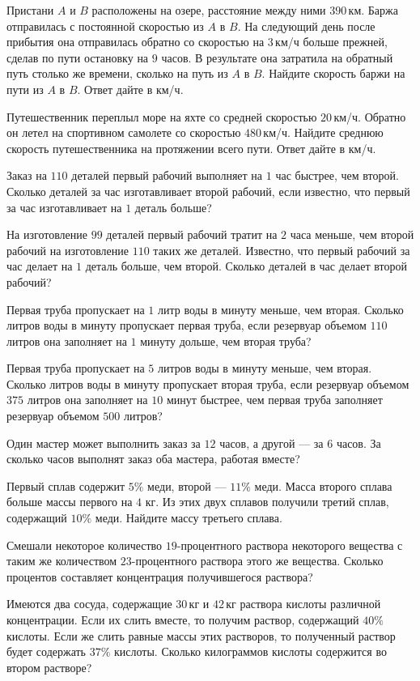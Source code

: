 \begin{consultation}
	\begin{listofex}
		\item Пристани \( A \) и \( B \) расположены на озере, расстояние между ними \( 390 \) км. Баржа отправилась с постоянной скоростью из \( A \) в \( B \). На следующий день после прибытия она отправилась обратно со скоростью на \( 3 \) км/ч больше прежней, сделав по пути остановку на \( 9 \) часов. В результате она затратила на обратный путь столько же времени, сколько на путь из \( A \) в \( B \). Найдите скорость баржи на пути из \( A \) в \( B \). Ответ дайте в км/ч.
		\item Путешественник переплыл море на яхте со средней скоростью \( 20 \) км/ч. Обратно он летел на спортивном самолете со скоростью \( 480 \) км/ч. Найдите среднюю скорость путешественника на протяжении всего пути. Ответ дайте в км/ч.
		\item Заказ на \( 110 \) деталей первый рабочий выполняет на \( 1 \) час быстрее, чем второй. Сколько деталей за час изготавливает второй рабочий, если известно, что первый за час изготавливает на \( 1 \) деталь больше?
		\item На изготовление \( 99 \) деталей первый рабочий тратит на \( 2 \) часа меньше, чем второй рабочий на изготовление \( 110 \) таких же деталей. Известно, что первый рабочий за час делает на \( 1 \) деталь больше, чем второй. Сколько деталей в час делает второй рабочий?
		\item Первая труба пропускает на \( 1 \) литр воды в минуту меньше, чем вторая. Сколько литров воды в минуту пропускает первая труба, если резервуар объемом \( 110 \) литров она заполняет на \( 1 \) минуту дольше, чем вторая труба?
		\item Первая труба пропускает на \( 5 \) литров воды в минуту меньше, чем вторая. Сколько литров воды в минуту пропускает вторая труба, если резервуар объемом \( 375 \) литров она заполняет на \( 10 \) минут быстрее, чем первая труба заполняет резервуар объемом \( 500 \) литров?
		\item Один мастер может выполнить заказ за \( 12 \) часов, а другой --- за \( 6 \) часов. За сколько часов выполнят заказ оба мастера, работая вместе?
		\item Первый сплав содержит \( 5\% \) меди, второй --- \( 11\% \) меди. Масса второго сплава больше массы первого на \( 4 \) кг. Из этих двух сплавов получили третий сплав, содержащий \( 10\% \) меди. Найдите массу третьего сплава.
		\item Смешали некоторое количество \( 19 \)-процентного раствора некоторого вещества с таким же количеством \( 23 \)-процентного раствора этого же вещества. Сколько процентов составляет концентрация получившегося раствора?
		\item Имеются два сосуда, содержащие \( 30 \) кг и \( 42 \) кг раствора кислоты различной концентрации. Если их слить вместе, то получим раствор, содержащий \( 40\% \) кислоты. Если же слить равные массы этих растворов, то полученный раствор будет содержать \( 37\% \) кислоты. Сколько килограммов кислоты содержится во втором растворе?
	\end{listofex}
\end{consultation}
